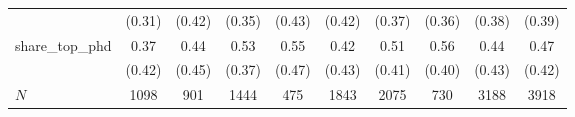 {\begin{tabular}{l*{9}{c}}
            &      (0.31)&      (0.42)&      (0.35)&      (0.43)&      (0.42)&      (0.37)&      (0.36)&      (0.38)&      (0.39)\\
share\_top\_phd&        0.37&        0.44&        0.53&        0.55&        0.42&        0.51&        0.56&        0.44&        0.47\\
            &      (0.42)&      (0.45)&      (0.37)&      (0.47)&      (0.43)&      (0.41)&      (0.40)&      (0.43)&      (0.42)\\
\hline
\(N\)       &        1098&         901&        1444&         475&        1843&        2075&         730&        3188&        3918\\
\hline\hline
\end{tabular}
}
